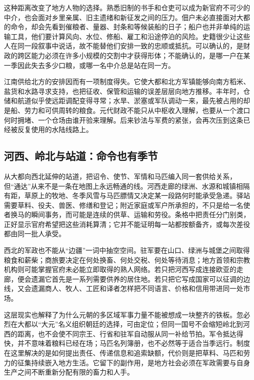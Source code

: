 这种距离改变了地方人物的选择。熟悉旧制的书手和仓吏可以成为新官府不可少的中介，也会面对乡里亲属、旧主遗绪和新征发之间的压力。佃户未必直接面对大都的命令，却会先看到催粮者、量器、封条和等候装船的日子；船户也并非单纯的运输工具，他们要计算风向、水位、修船、雇工和沿途停泊的风险。史籍很少让这些人在同一段叙事中说话，故不能替他们安排一致的忠顺或抵抗。可以确认的，是财政的跨区能力必须在许多小规模的交割中才获得形体；不能确认的，是哪一户在某一季因此失去多少口粮，或哪一名中介总是站在同一方。

江南供给北方的安排因而有一项制度得失。它使大都和北方军镇能够向南方稻米、盐货和水路寻求支持，也把征收、保管和运输的误差层层向地方推移。丰年时，仓储和航道似乎使远距调配变得寻常；水旱、淤塞或军队调动一来，最先被占用的却是船、劳力和可供周转的粮食。元代财政不能只从中枢收入理解，也要从一个渡口何时拥堵、一个仓场由谁开验来理解。后来钞法与军费的紧张，会再次压到这条已经被反复使用的水陆线路上。

\subsection{河西、岭北与站道：命令也有季节}

从大都向西北延伸的站道，把诏令、使节、军情和马匹编入同一套供给关系，但“通达”从来不是一条在地图上永远畅通的线。河西走廊的绿洲、水源和城镇相隔有距，草原上的牧地、冬季风雪与马匹膘情又决定某一段路何时能承受急递。驿站需要草料、役夫、兽医、修缮和登记；附近家庭或军户所承担的，不只是给一名使者换马的瞬间事务，而可能是连续的供草、运输和劳役。条格中把责任分门别类，正好显示官府希望把这些消耗算清；它并不能证明每一站都按额备齐，或每次差役都由同一批人承受。

西北的军政也不能从“边疆”一词中抽空空间。驻军要在山口、绿洲与城堡之间取得粮食和薪柴；商旅要决定在何处换畜、何处交税、何处等待消息；地方首领和宗教机构则可能掌握官府未必能立即取得的熟人网络。若只把河西写成连接欧亚的走廊，便会遗漏它首先是一系列需要供养的居住地。若只把它写成国家可以征调的边线，又会遗漏商人、牧人、工匠和译者怎样把不同语言、价格和信用带进同一处市场。

这层现实也解释了为什么元朝的多区域军事力量不能被想成一块整齐的铁板。忽必烈在大都以“大元”名义组织朝廷的选择，可由定位；但同一国号不会缩短岭北到河西的距离，也不会使不同宗王、行省和驻军自动服从同一补给节拍。军令抵达得快，并不意味着粮料已经在场；马匹名列簿册，也不必然等于适合当季远行。制度在这里解决的是如何提出责任、传递信息和追索缺额，代价则是把草料、马匹和劳力的征集持续嵌入地方生活。它留下的副作用，是地方社会必须在军政需要与自身生产之间不断重新分配有限的畜力和人手。

